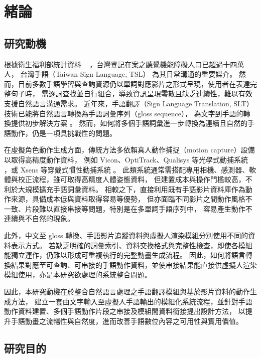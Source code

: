 \documentclass[class=NCU_thesis, crop=false]{standalone}
\begin{document}
\chapter{緒論}

\section{研究動機}

根據衛生福利部統計資料 ~\cite{mohw2026report} ，台灣登記在案之聽覺機能障礙人口已超過十四萬人，
台灣手語（Taiwan Sign Language, TSL） \cite{tsl_website}為其日常溝通的重要媒介。
然而，目前多數手語學習與查詢資源仍以單詞對應影片之形式呈現，使用者在表達完整句子時，
需逐詞查找並自行組合，導致資訊呈現零散且缺乏連續性，難以有效支援自然語言溝通需求。
近年來，手語翻譯（Sign Language Translation, SLT）技術已能將自然語言轉換為手語詞彙序列（gloss sequence），
為文字到手語的轉換提供初步解決方案 \cite{Chu2025SLT} \cite{abdullah2025stateofthearttranslationtexttoglossusing} 。
然而，如何將多個手語詞彙進一步轉換為連續且自然的手語動作，仍是一項具挑戰性的問題。

在虛擬角色動作生成方面，傳統方法多依賴真人動作捕捉（motion capture）設備以取得高精度動作資料，
例如 Vicon、OptiTrack、Qualisys 等光學式動捕系統 \cite{optitrack_mocap} \cite{qualisys_mocap}，或 Xsens 等穿戴式慣性動捕系統 \cite{xsens_mocap}。
此類系統通常需搭配專用相機、感測器、軟體與校正流程，雖可取得高精度人體姿態資料，
但建置成本與操作門檻較高，不利於大規模擴充手語詞彙資料。
相較之下，直接利用既有手語影片資料庫作為動作來源，具備成本低與資料取得容易等優勢，
但亦面臨不同影片之間動作風格不一致、片段難以直接串接等問題，特別是在多單詞手語序列中，
容易產生動作不連續與不自然的現象。

此外，中文至 gloss 轉換、手語影片追蹤資料與虛擬人渲染模組分別使用不同的資料表示方式。
若缺乏明確的詞彙索引、資料交換格式與完整性檢查，即使各模組能獨立運作，仍難以形成可重複執行的完整動畫生成流程。
因此，如何將語言轉換結果對應至可查詢、可串接的手語動作資料，並使串接結果能直接供虛擬人渲染模組使用，亦是本研究欲處理的系統整合問題。

因此，本研究動機在於整合自然語言處理之手語翻譯模組與基於影片資料的動作生成方法，
建立一套由文字輸入至虛擬人手語輸出的模組化系統流程，並針對手語動作資料建置、多個手語動作片段之串接及模組間資料銜接提出設計方法，
以提升手語動畫之流暢性與自然度，進而改善手語數位內容之可用性與實用價值。


\pagebreak

\section{研究目的}
\end{document}
